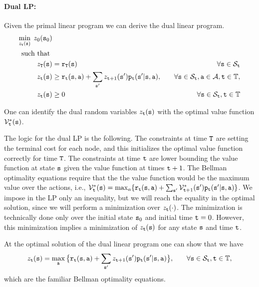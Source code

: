 \paragraph{Dual LP:}
Given the primal linear program we can derive the dual linear
program.
\begin{align*}
\min_{z_{\tt t}({\tt s})}  \;z_0({\tt s}_0)&\\
\mbox{ such that }\\
z_{{\tt T}}({\tt s}) &= {\tt r}_{{\tt T}}({\tt s}) &\quad\forall
{\tt s} \in {\mathcal{S}_{{\tt t}}}\\
 z_{{\tt t}}({\tt s}) &\geq
{\tt r}_{{\tt t}}({\tt s},{\tt a}) + \sum_{{\tt s}'}z_{{\tt t} +
1}({\tt s}'){\tt p}_{{\tt t}}({\tt s}'|{\tt s},{\tt a}) , &\quad\forall {\tt s}
\in {\mathcal{S}_{{\tt t}}},{\tt a}\in\mathcal{A}, {\tt t}\in\mathbb{T},\\ 
 z_{{\tt t}}({\tt s}) &\geq 0 &\quad\forall {\tt s}
\in {\mathcal{S}_{{\tt t}}},{\tt t}\in\mathbb{T}
\end{align*}

One can identify the dual random variables $z_{\tt t}({\tt s})$ with
the optimal value function $\mathcal{V}^*_{\tt t}({\tt s})$. 

The logic for the dual LP is the following.
The constraints at time ${\tt T}$ are setting the terminal cost for each node, and this initializes the optimal value function correctly for time ${\tt T}$.
The constraints at time ${\tt t}$ are lower bounding the value function at state ${\tt s}$ given the value function at times ${\tt t}+1$. The Bellman optimality equations require that the the value function would be the maximum value over the actions, i.e., $\mathcal{V}_{\tt t}^*({\tt s})=\max_a \{{\tt r}_{{\tt t}}({\tt s},{\tt a}) + \sum_{{\tt s}'}\mathcal{V}^*_{{\tt t} +
1}({\tt s}'){\tt p}_{{\tt t}}({\tt s}'|{\tt s},{\tt a})\}$. We impose in the LP only an inequality, but we will reach the equality in the optimal solution, since we will perform a minimization over $z_{\tt t}(\cdot)$. 
The minimization is technically done only over the initial state ${\tt s}_0$ and initial time ${\tt t}=0$. However, this minimization implies a minimization of  $z_{\tt t}({\tt s})$ for any state ${\tt s}$ and time ${\tt t}$. 

At the optimal
solution of the dual linear program one can show that we have
\begin{align*}
 z_{{\tt t}}({\tt s}) &= \max_{\tt a} \big\{
{\tt r}_{{\tt t}}({\tt s},{\tt a}) + \sum_{{\tt s}'}z_{{\tt t} +
1}({\tt s}'){\tt p}_{{\tt t}}({\tt s}'|{\tt s},{\tt a}) \big\} , &\quad\forall
{\tt s} \in {\mathcal{S}_{{\tt t}}}, {\tt t}\in\mathbb{T},
\end{align*}
which are the familiar Bellman optimality equations.

